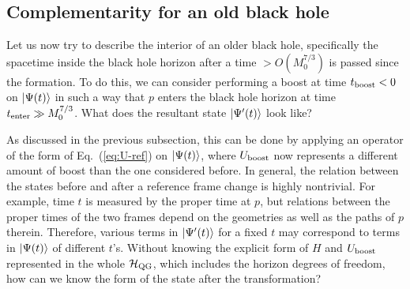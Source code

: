 \documentclass[12pt]{article}
\begin{document}
\subsection{Complementarity for an old black hole}
\label{subsec:compl-old}

Let us now try to describe the interior of an older black hole, specifically 
the spacetime inside the black hole horizon after a time $> O(M_0^{7/3})$ 
is passed since the formation.  To do this, we can consider performing 
a boost at time $t_{\rm boost} < 0$ on $\left| \Psi(t) \right>$ in such a way that 
$p$ enters the black hole horizon at time $t_{\rm enter} \gg M_0^{7/3}$. 
What does the resultant state $\left| \Psi'(t) \right>$ look like?

As discussed in the previous subsection, this can be done by applying 
an operator of the form of Eq.~(\ref{eq:U-ref}) on $\left| \Psi(t) \right>$, where 
$U_{\rm boost}$ now represents a different amount of boost than the one 
considered before.  In general, the relation between the states before 
and after a reference frame change is highly nontrivial.  For example, 
time $t$ is measured by the proper time at $p$, but relations between 
the proper times of the two frames depend on the geometries as well as 
the paths of $p$ therein.  Therefore, various terms in $\left| \Psi'(t) \right>$ 
for a fixed $t$ may correspond to terms in $\left| \Psi(t) \right>$ of different 
$t$'s.  Without knowing the explicit form of $H$ and $U_{\rm boost}$ 
represented in the whole ${\cal H}_{\rm QG}$, which includes the horizon 
degrees of freedom, how can we know the form of the state after the 
transformation?
\end{document}
